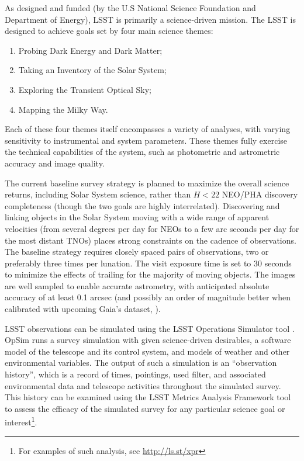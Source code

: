 As designed and funded (by the U.S National Science Foundation and
Department of Energy), LSST is primarily a science-driven mission.
The LSST is designed to achieve goals set by four main science themes:
\begin{enumerate}
\item Probing Dark Energy and Dark Matter;
\item Taking an Inventory of the Solar System;
\item Exploring the Transient Optical Sky;
\item Mapping the Milky Way.
\end{enumerate}
Each of these four themes itself encompasses a variety of analyses, with
varying sensitivity to instrumental and system parameters. These themes
fully exercise the technical capabilities of the system, such as photometric
and astrometric accuracy and image quality.

The current baseline survey strategy is planned to maximize the overall science returns, including
Solar System science, rather than $H<22$ NEO/PHA discovery completeness (though the
two goals are highly interrelated). Discovering and linking objects in the Solar System
moving with a wide range of apparent velocities (from several degrees per day for
NEOs to a few arc seconds per day for the most distant TNOs) places strong
constraints on the cadence of observations. The baseline strategy requires closely
spaced pairs of observations, two or preferably three times per lunation. The visit
exposure time is set to 30 seconds to minimize the effects of trailing for the majority of
moving objects. The images are well sampled to enable accurate astrometry, with
anticipated absolute accuracy of at least 0.1 arcsec (and possibly an order of magnitude
better when calibrated with upcoming Gaia's dataset, \citealt{Gaia}).

LSST observations can be simulated using the LSST Operations Simulator tool
\citep[OpSim,][]{delgado14}. OpSim runs a survey simulation with given
science-driven desirables,  a software model of the telescope and its control
system, and models of weather and other  environmental variables. The output of
such a simulation is an ``observation history'', which  is a record of times,
pointings, used filter, and associated environmental data and telescope
activities throughout the simulated survey.  This history can be examined using
the LSST  Metrics Analysis Framework tool \citep[MAF,][]{jones14} to assess the
efficacy of the simulated survey for any particular science goal or
interest\footnote{For examples of such analysis, see \url{http://ls.st/xpr}}.



